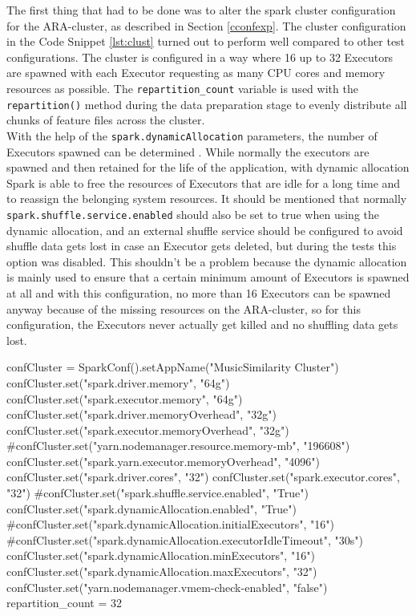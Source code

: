 \noindent The first thing that had to be done was to alter the spark cluster configuration for the ARA-cluster, as described in Section \ref{cconfexp}.
\noindent The cluster configuration in the Code Snippet \ref{lst:clust} turned out to perform well compared to other test configurations. The cluster is configured in a way where 16 up to 32 Executors are spawned with each Executor requesting as many CPU cores and memory resources as possible. The \lstinline{repartition_count} variable is used with the \lstinline{repartition()} method during the data preparation stage to evenly distribute all chunks of feature files across the cluster.\\
\noindent With the help of the \lstinline{spark.dynamicAllocation} parameters, the number of Executors spawned can be determined \cite[p. 153]{sparkbook1}. While normally the executors are spawned and then retained for the life of the application, with dynamic allocation Spark is able to free the resources of Executors that are idle for a long time and to reassign the belonging system resources. 
It should be mentioned that normally \lstinline{spark.shuffle.service.enabled} should also be set to true when using the dynamic allocation, and an external shuffle service should be configured to avoid shuffle data gets lost in case an Executor gets deleted, but during the tests this option was disabled. This shouldn't be a problem because the dynamic allocation is mainly used to ensure that a certain minimum amount of Executors is spawned at all and with this configuration, no more than 16 Executors can be spawned anyway because of the missing resources on the ARA-cluster, so for this configuration, the Executors never actually get killed and no shuffling data gets lost.\\

\begin{pythonCode}[frame=single,label={lst:clust},caption={Cluster setup},captionpos=b]
confCluster = SparkConf().setAppName("MusicSimilarity Cluster")
confCluster.set("spark.driver.memory", "64g")
confCluster.set("spark.executor.memory", "64g")
confCluster.set("spark.driver.memoryOverhead", "32g")
confCluster.set("spark.executor.memoryOverhead", "32g")
#confCluster.set("yarn.nodemanager.resource.memory-mb", "196608")
confCluster.set("spark.yarn.executor.memoryOverhead", "4096")
confCluster.set("spark.driver.cores", "32")
confCluster.set("spark.executor.cores", "32")
#confCluster.set("spark.shuffle.service.enabled", "True")
confCluster.set("spark.dynamicAllocation.enabled", "True")
#confCluster.set("spark.dynamicAllocation.initialExecutors", "16")
#confCluster.set("spark.dynamicAllocation.executorIdleTimeout", "30s")	
confCluster.set("spark.dynamicAllocation.minExecutors", "16")
confCluster.set("spark.dynamicAllocation.maxExecutors", "32")
confCluster.set("yarn.nodemanager.vmem-check-enabled", "false")
repartition_count = 32
\end{pythonCode}

